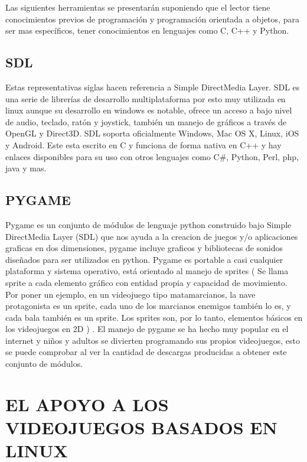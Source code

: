Las siguientes herramientas se presentarán suponiendo que el
lector tiene conocimientos previos de programación y
programación orientada a objetos, para ser mas específicos,
tener conocimientos en lenguajes como C, C++ y Python.

\subsection*{SDL}

Estas representativas siglas hacen referencia a Simple
DirectMedia Layer. SDL es una serie de librerías de desarrollo
multiplataforma por esto muy utilizada en linux aunque su
desarrollo en windows es notable, ofrece un acceso a bajo nivel
de audio, teclado, ratón y joystick, también un manejo de
gráficos a través de OpenGL y Direct3D. SDL soporta
oficialmente Windows, Mac OS X, Linux, iOS y Android. Este
esta escrito en C y funciona de forma nativa en C++ y hay
enlaces disponibles para su uso con otros lenguajes como C\#,
Python, Perl, php, java y mas.

\subsection*{PYGAME}

Pygame es un conjunto de módulos de lenguaje python
construido bajo Simple DirectMedia Layer (SDL) que nos ayuda
a la creacion de juegos y/o aplicaciones graficas en dos
dimensiones, pygame incluye graficos y bibliotecas de sonidos
diseñados para ser utilizados en python. Pygame es portable a
casi cualquier plataforma y sistema operativo, está orientado al
manejo de sprites ( Se llama sprite a cada elemento gráfico con
entidad propia y capacidad de movimiento. Por poner un
ejemplo, en un videojuego tipo matamarcianos, la nave
protagonista es un sprite, cada uno de los marcianos enemigos
también lo es, y cada bala también es un sprite. Los sprites son,
por lo tanto, elementos básicos en los videojuegos en 2D ) . El
manejo de pygame se ha hecho muy popular en el internet y
niños y adultos se divierten programando sus propios
videojuegos, esto se puede comprobar al ver la cantidad de
descargas producidas a obtener este conjunto de módulos.

\section*{EL APOYO A LOS VIDEOJUEGOS BASADOS EN LINUX}

